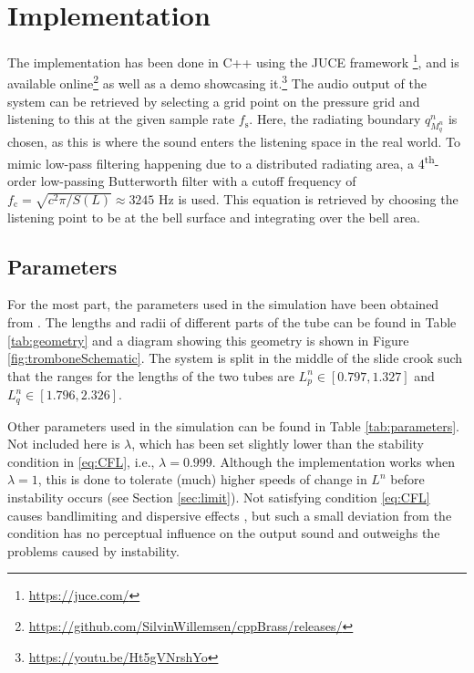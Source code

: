 \section{Implementation}\label{sec:implementation}
The implementation has been done in C++ using the JUCE framework \footnote{\href{https://juce.com/}{https://juce.com/}}, and is available online\footnote{\href{https://github.com/SilvinWillemsen/cppBrass/releases/}{https://github.com/SilvinWillemsen/cppBrass/releases/}} as well as a demo showcasing it.\footnote{\href{https://youtu.be/Ht5gVNrshYo}{https://youtu.be/Ht5gVNrshYo}} The audio output of the system can be retrieved by selecting a grid point on the pressure grid and listening to this at the given sample rate $f_\text{s}$. Here, the radiating boundary $q_{M_q^n}^n$ is chosen, as this is where the sound enters the listening space in the real world. %
To mimic low-pass filtering happening due to a distributed radiating area, a 4\textsuperscript{th}-order low-passing Butterworth filter with a cutoff frequency of $f_\text{c}= \sqrt{c^2\pi/S(L)} \approx 3245$ Hz is used. This equation is retrieved by choosing the listening point to be at the bell surface and integrating over the bell area. 

\subsection{Parameters}
For the most part, the parameters used in the simulation have been obtained from \cite{Harrison2018, Smyth2011, Benade1968}. The lengths and radii of different parts of the tube can be found in Table \ref{tab:geometry} and a diagram showing this geometry is shown in Figure \ref{fig:tromboneSchematic}.
The system is split in the middle of the slide crook such that the ranges for the lengths of the two tubes are $L_p^n \in[0.797, 1.327]$ and $L_q^n \in [1.796, 2.326]$.

Other parameters used in the simulation can be found in Table \ref{tab:parameters}. Not included here is $\lambda$, which has been set slightly lower than the stability condition in \eqref{eq:CFL}, i.e., $\lambda = 0.999$. Although the implementation works when $\lambda = 1$, this is done to tolerate (much) higher speeds of change in $L^n$ before instability occurs (see Section \ref{sec:limit}). Not satisfying condition \eqref{eq:CFL} causes bandlimiting and dispersive effects \cite{bilbao2009}, but such a small deviation from the condition has no perceptual influence on the output sound and outweighs the problems caused by instability.

